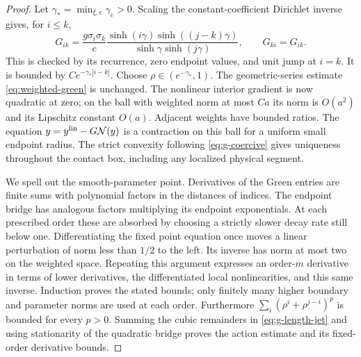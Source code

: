 \begin{proof}
Let $\gamma_* =\min_{\xi,e}\gamma_e>0$. Scaling the constant-coefficient
Dirichlet inverse gives, for $i\le k$,
\[
 G_{ik}=\frac{g\sigma_i\sigma_k}{c}
    \frac{\sinh(i\gamma)\sinh((j-k)\gamma)}
         {\sinh\gamma\sinh(j\gamma)},\qquad G_{ki}=G_{ik}.
\]
This is checked by its recurrence, zero endpoint values, and unit jump
at $i=k$. It is bounded by $C e^{-\gamma_*|i-k|}$. Choose
$\rho\in(e^{-\gamma_*},1)$. The geometric-series estimate
\eqref{eq:weighted-green} is unchanged. The nonlinear interior gradient
is now quadratic at zero; on the ball with weighted norm at most $Ca$
its norm is $O(a^2)$ and its Lipschitz constant $O(a)$. Adjacent weights
have bounded ratios. The equation $y=y^{\rm lin}-G\mathcal N(y)$ is a
contraction on this ball for a uniform small endpoint radius. The strict
convexity following \eqref{eq:g-coercive} gives uniqueness throughout the
contact box, including any localized physical segment.

We spell out the smooth-parameter point. Derivatives of the Green entries
are finite sums with polynomial factors in the distances of indices.
The endpoint bridge has analogous factors multiplying its endpoint
exponentials. At each prescribed order these are absorbed by choosing a
strictly slower decay rate still below one. Differentiating the fixed
point equation once moves a linear perturbation of norm less than
$1/2$ to the left. Its inverse has norm at most two on the weighted
space. Repeating this argument expresses an order-$m$ derivative in
terms of lower derivatives, the differentiated local nonlinearities,
and this same inverse. Induction proves the stated bounds; only finitely
many higher boundary and parameter norms are used at each order.
Furthermore $\sum_i(\rho^i+\rho^{j-i})^p$ is bounded for every $p>0$.
Summing the cubic remainders in \eqref{eq:g-length-jet} and using
stationarity of the quadratic bridge proves the action estimate and
its fixed-order derivative bounds.


\end{proof}
